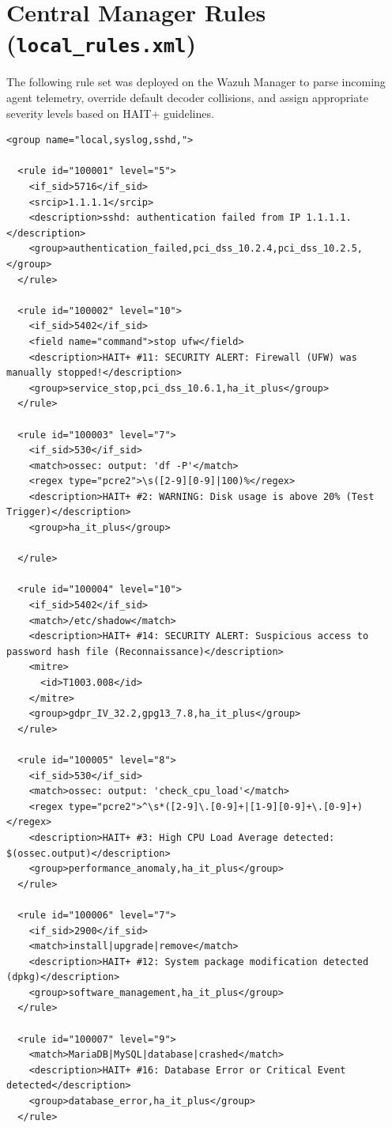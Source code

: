 \section{Central Manager Rules (\texttt{local\_rules.xml})}
The following rule set was deployed on the Wazuh Manager to parse incoming agent telemetry, override default decoder collisions, and assign appropriate severity levels based on HAIT+ guidelines.

\begin{verbatim}
<group name="local,syslog,sshd,">

  <rule id="100001" level="5">
    <if_sid>5716</if_sid>
    <srcip>1.1.1.1</srcip>
    <description>sshd: authentication failed from IP 1.1.1.1.</description>
    <group>authentication_failed,pci_dss_10.2.4,pci_dss_10.2.5,</group>
  </rule>

  <rule id="100002" level="10">
    <if_sid>5402</if_sid>
    <field name="command">stop ufw</field>
    <description>HAIT+ #11: SECURITY ALERT: Firewall (UFW) was manually stopped!</description>
    <group>service_stop,pci_dss_10.6.1,ha_it_plus</group>
  </rule>

  <rule id="100003" level="7">
    <if_sid>530</if_sid>
    <match>ossec: output: 'df -P'</match>
    <regex type="pcre2">\s([2-9][0-9]|100)%</regex>
    <description>HAIT+ #2: WARNING: Disk usage is above 20% (Test Trigger)</description>
    <group>ha_it_plus</group>

  </rule>

  <rule id="100004" level="10">
    <if_sid>5402</if_sid>
    <match>/etc/shadow</match>
    <description>HAIT+ #14: SECURITY ALERT: Suspicious access to password hash file (Reconnaissance)</description>
    <mitre>
      <id>T1003.008</id>
    </mitre>
    <group>gdpr_IV_32.2,gpg13_7.8,ha_it_plus</group>
  </rule>  

  <rule id="100005" level="8">
    <if_sid>530</if_sid>
    <match>ossec: output: 'check_cpu_load'</match>
    <regex type="pcre2">^\s*([2-9]\.[0-9]+|[1-9][0-9]+\.[0-9]+)</regex>
    <description>HAIT+ #3: High CPU Load Average detected: $(ossec.output)</description>
    <group>performance_anomaly,ha_it_plus</group>
  </rule> 

  <rule id="100006" level="7">
    <if_sid>2900</if_sid>
    <match>install|upgrade|remove</match>
    <description>HAIT+ #12: System package modification detected (dpkg)</description>
    <group>software_management,ha_it_plus</group>
  </rule>
  
  <rule id="100007" level="9">
    <match>MariaDB|MySQL|database|crashed</match>
    <description>HAIT+ #16: Database Error or Critical Event detected</description>
    <group>database_error,ha_it_plus</group>
  </rule>


\end{verbatim}
